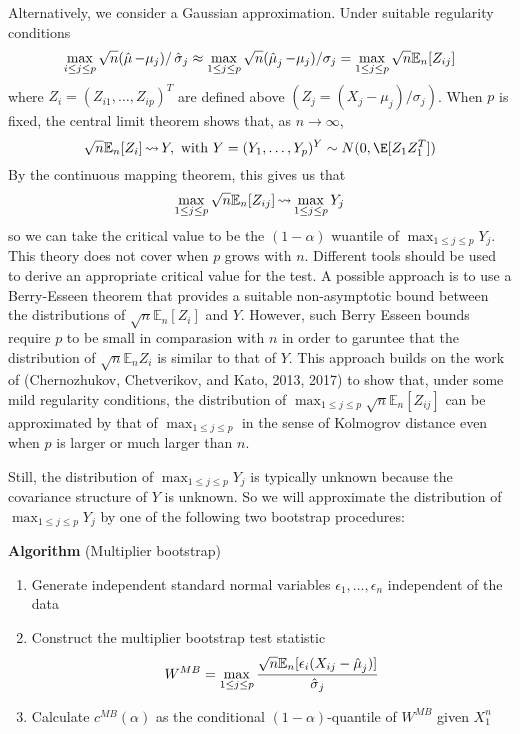 Alternatively, we consider a Gaussian approximation. Under suitable regularity conditions
\[\max_{i\leq j\leq p} \sqrt{n}(\operatorname{\hat{\mu}} - \mu_j)/\operatorname{\hat{\sigma}}_j \approx \max_{1\leq j \leq p} \sqrt{n}(\operatorname{\hat{\mu}}_j - \mu_j)/\sigma_j = \max_{1 \leq j \leq p} \sqrt{n}\mathbb{E}_n[Z_{ij}]\]
where $Z_i = (Z_{i1},\dots, Z_{ip})^T$ are defined above $(Z_j = (X_j - \mu_j)/\sigma_j)$. When $p$ is fixed, the central limit theorem shows that, as $n \rightarrow \infty$, 
\[\sqrt{n}\mathbb{E}_n[Z_i] \wcov Y, \text{ with }Y=(Y_1, \dots, Y_p)^Y \sim N(0, \E[Z_1Z_1^T])\] 
By the continuous mapping theorem, this gives us that 
\[\max_{1 \leq j \leq p}\sqrt{n}\mathbb{E}_n[Z_{ij}]\operatorname{\rightsquigarrow} \max_{1\leq j \leq p} Y_j\]
so we can take the critical value to be the $(1-\alpha)$ wuantile of $\max_{1\leq j \leq p} Y_j$. This theory does not cover when $p$ grows with $n$. Different tools should be used to derive an appropriate critical value for the test. A possible approach is to use a Berry-Esseen theorem that provides a suitable non-asymptotic bound between the distributions of $\sqrt{n}\mathbb{E}_n[Z_i]$ and $Y$. However, such Berry Esseen bounds require $p$ to be small in comparasion with $n$ in order to garuntee that the distribution of $\sqrt{n} \mathbb{E}_n Z_i$ is similar to that of $Y$. This approach builds on the work of (Chernozhukov, Chetverikov, and Kato, 2013, 2017) to show that, under some mild regularity conditions, the distribution of $\max_{1 \leq j \leq p} \sqrt{n}\mathbb{E}_n[Z_{ij}]$ can be approximated by that of $\max_{1 \leq j \leq p}$ in the sense of Kolmogrov distance even when $p$ is larger or much larger than $n$. 

Still, the distribution of $\max_{1\leq j \leq p} Y_j$ is typically unknown because the covariance structure of $Y$ is unknown. So we will approximate the distribution of $\max_{1\leq j \leq p}Y_j$ by one of the following two bootstrap procedures:

\textbf{Algorithm} (Multiplier bootstrap)
\begin{enumerate}
	\item Generate independent standard normal variables $\epsilon_1, \dots, \epsilon_n$ independent of the data 
	\item Construct the multiplier bootstrap test statistic 
	\begin{equation}
		\label{eq:CCK-30}
		W^{MB} = \max_{1 \leq j \leq p} \frac{\sqrt{n}\mathbb{E}_n[\epsilon_i(X_{ij} - \operatorname{\hat{\mu}}_j)]}{\operatorname{\hat{\sigma}}_j} 
	\end{equation}
	\item Calculate $c^{MB}(\alpha)$ as the conditional $(1-\alpha)$-quantile of $W^{MB}$ given $X_1^n$
\end{enumerate}

